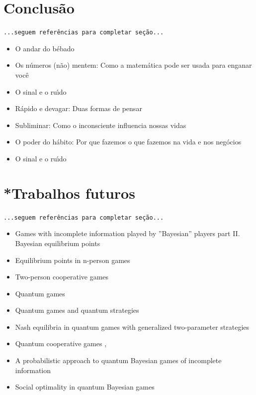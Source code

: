 \documentclass[
	article,			        %
	11pt,				          %
	oneside,			        %
	a4paper,			        %
	english,			        %
	brazil,				        %
	sumario=tradicional
]{abntex2}\usepackage[]{graphicx}\usepackage[]{color}
\begin{document}
% 

\section{Conclusão}

  \texttt{\color{red}...seguem refer\^encias para completar seção...}
  \begin{itemize}
    \item O andar do b\'ebado \cite{Mlodinow.2009}
    \item Os n\'umeros (n\~ao) mentem: Como a matem\'atica pode ser usada para enganar voc\^e \cite{Seife.2012}
    \item O sinal e o ru\'{\i}do \cite{Nate.2012}
    \item R{\'a}pido e devagar: Duas formas de pensar \cite{Kahneman.2012}
    \item Subliminar: Como o inconsciente influencia nossas vidas \cite{Mlodinow.2013}
    \item O poder do h{\'a}bito: Por que fazemos o que fazemos na vida e nos neg{\'o}cios \cite{Duhigg.2012}
    \item O sinal e o ru\'{\i}do \cite{Nate.2012}
  \end{itemize}

\section{*Trabalhos futuros}

  \texttt{\color{red}...seguem refer\^encias para completar seção...}
  \begin{itemize}
    \item Games with incomplete information played by ''Bayesian'' players part II. Bayesian equilibrium points \cite{Harsanyi.1968}
    \item Equilibrium points in n-person games \cite{Nash.1950}
    \item Two-person cooperative games \cite{Nash.1953}
    \item Quantum games \cite{JoseFigueiredo.2004}
    \item Quantum games and quantum strategies \cite{Eisert.1999}
    \item Nash equilibria in quantum games with generalized two-parameter strategies \cite{Flitney.2007}
    \item Quantum cooperative games \cite{Iqbal.2002},\cite{Dai.2004}
    \item A probabilistic approach to quantum Bayesian games of incomplete information \cite{Iqbal.2014}
    \item Social optimality in quantum Bayesian games \cite{Azhar.2015}
  \end{itemize}
\end{document}
